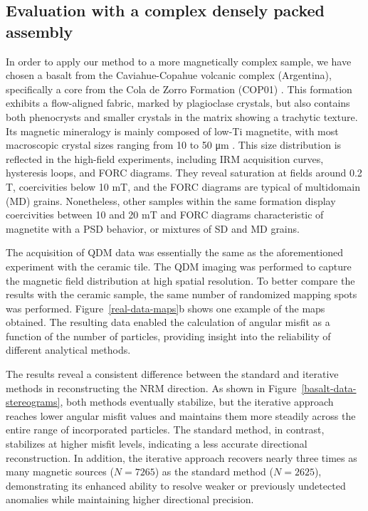 \documentclass[onecolumn,12pt,a4paper]{article}
\begin{document}
\subsection{Evaluation with a complex densely packed assembly}

In order to apply our method to a more magnetically complex sample, we have chosen a basalt from the Caviahue-Copahue volcanic complex (Argentina), specifically a core from the Cola de Zorro Formation (COP01) \citep{Moncinhatto2019}. This formation exhibits a flow-aligned fabric, marked by plagioclase crystals, but also contains both phenocrysts and smaller crystals in the matrix showing a trachytic texture. Its magnetic mineralogy is mainly composed of low-Ti magnetite, with most macroscopic crystal sizes ranging from 10 to 50 \si{\micro\meter} \citep{Moncinhatto2019}. This size distribution is reflected in the high-field experiments, including IRM acquisition curves, hysteresis loops, and FORC diagrams. They reveal saturation at fields around 0.2 \si{T}, coercivities below 10 \si{mT}, and the FORC diagrams are typical of multidomain (MD) grains. Nonetheless, other samples within the same formation display coercivities between 10 and 20 \si{mT} and FORC diagrams characteristic of magnetite with a PSD behavior, or mixtures of SD and MD grains.

The acquisition of QDM data was essentially the same as the aforementioned experiment with the ceramic tile. The QDM imaging was performed to capture the magnetic field distribution at high spatial resolution. To better compare the results with the ceramic sample, the same number of randomized mapping spots was performed. Figure~\ref{real-data-maps}b shows one example of the maps obtained. The resulting data enabled the calculation of angular misfit as a function of the number of particles, providing insight into the reliability of different analytical methods.

The results reveal a consistent difference between the standard and iterative methods in reconstructing the NRM direction. As shown in Figure~\ref{basalt-data-stereograms}, both methods eventually stabilize, but the iterative approach reaches lower angular misfit values and maintains them more steadily across the entire range of incorporated particles. The standard method, in contrast, stabilizes at higher misfit levels, indicating a less accurate directional reconstruction. In addition, the iterative approach recovers nearly three times as many magnetic sources (\(N=7265\)) as the standard method (\(N=2625\)), demonstrating its enhanced ability to resolve weaker or previously undetected anomalies while maintaining higher directional precision.
\end{document}
